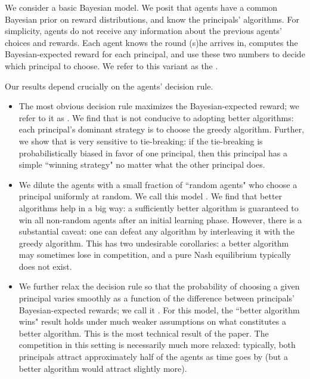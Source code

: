 We consider a basic Bayesian model. We posit that agents have a common Bayesian prior on reward distributions, and know the principals' algorithms. For simplicity, agents do not receive any information about the previous agents' choices and rewards. Each agent knows the round (s)he arrives in, computes the Bayesian-expected reward for each principal, and use these two numbers to decide which principal to choose. We refer to this variant as the \emph{\TheoryModel}.

Our results depend crucially on the agents' decision rule.
\begin{itemize}

\item The most obvious decision rule maximizes the Bayesian-expected reward; we refer to it as \HardMax. We find that \HardMax is not conducive to adopting better algorithms: each principal's dominant strategy is to choose the greedy algorithm. Further, we show that \HardMax is very sensitive to tie-breaking: if the tie-breaking is probabilistically biased in favor of one principal, then this principal has a simple ``winning strategy" no matter what the other principal does.

\item We dilute the \HardMax agents with a small fraction of ``random agents" who choose a principal uniformly at random. We call this model \HardMaxRandom. We find that better algorithms help in a big way: a sufficiently better algorithm is guaranteed to win all non-random agents after an initial learning phase. However, there is a substantial caveat: one can defeat any algorithm by interleaving it with the greedy algorithm. This has two undesirable corollaries: a better algorithm may sometimes lose in competition, and a pure Nash equilibrium typically does not exist.

\item We further relax the decision rule so that the probability of choosing a given principal varies smoothly as a function of the difference between  principals' Bayesian-expected rewards; we call it \SoftMaxRandom. For this model, the ``better algorithm wins" result holds under much weaker assumptions on what constitutes a better algorithm. This is the most technical result of the paper. The competition in this setting is necessarily much more relaxed: typically, both principals attract approximately half of the agents as time goes by (but a better algorithm would attract slightly more).
\end{itemize}

